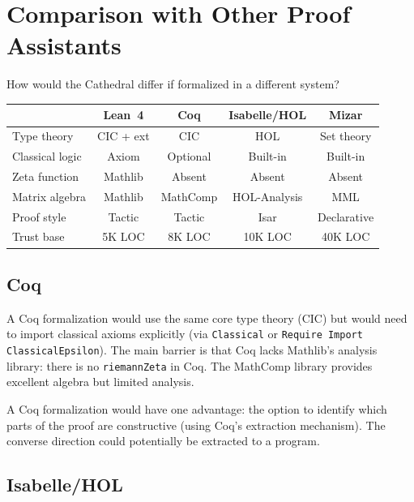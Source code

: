 \documentclass[11pt,a4paper]{article}
\theoremstyle{plain}
\theoremstyle{definition}
\newcommand{\lean}[1]{\texttt{#1}}
\begin{document}
\section{Comparison with Other Proof Assistants}
\label{sec:comparison}

How would the Cathedral differ if formalized in a different system?

\begin{center}
\small
\begin{tabular}{@{}lcccc@{}}
\toprule
& \textbf{Lean~4} & \textbf{Coq} & \textbf{Isabelle/HOL} & \textbf{Mizar} \\
\midrule
Type theory & CIC + ext & CIC & HOL & Set theory \\
Classical logic & Axiom & Optional & Built-in & Built-in \\
Zeta function & Mathlib & Absent & Absent & Absent \\
Matrix algebra & Mathlib & MathComp & HOL-Analysis & MML \\
Proof style & Tactic & Tactic & Isar & Declarative \\
Trust base & 5K LOC & 8K LOC & 10K LOC & 40K LOC \\
\bottomrule
\end{tabular}
\end{center}

\subsection{Coq}

A Coq formalization would use the same core type theory (CIC) but
would need to import classical axioms explicitly (via
\lean{Classical} or \lean{Require Import ClassicalEpsilon}). The
main barrier is that Coq lacks Mathlib's analysis library: there is
no \lean{riemannZeta} in Coq. The MathComp library provides excellent
algebra but limited analysis.

A Coq formalization would have one advantage: the option to identify
which parts of the proof are constructive (using Coq's extraction
mechanism). The converse direction could potentially be extracted
to a program.

\subsection{Isabelle/HOL}
\end{document}
